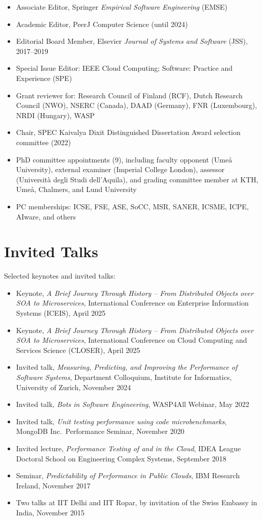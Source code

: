 \documentclass[a4paper,11pt]{article}
\begin{document}
\begin{itemize}
  \item Associate Editor, Springer \emph{Empirical Software Engineering} (EMSE)
  \item Academic Editor, PeerJ Computer Science (until 2024)
  \item Editorial Board Member, Elsevier \emph{Journal of Systems and Software} (JSS), 2017--2019
  \item Special Issue Editor: IEEE Cloud Computing; Software: Practice and Experience (SPE)
  \item Grant reviewer for: Research Council of Finland (RCF), Dutch Research Council (NWO), NSERC (Canada), DAAD (Germany), FNR (Luxembourg), NRDI (Hungary), WASP
  \item Chair, SPEC Kaivalya Dixit Distinguished Dissertation Award selection committee (2022)
  \item PhD committee appointments (9), including faculty opponent (Umeå University), external examiner (Imperial College London), assessor (Università degli Studi dell'Aquila), and grading committee member at KTH, Umeå, Chalmers, and Lund University
  \item PC memberships: ICSE, FSE, ASE, SoCC, MSR, SANER, ICSME, ICPE, AIware, and others
\end{itemize}

\section{Invited Talks}

Selected keynotes and invited talks:
\begin{itemize}
  \item Keynote, \emph{A Brief Journey Through History -- From Distributed Objects over SOA to Microservices}, International Conference on Enterprise Information Systems (ICEIS), April 2025
  \item Keynote, \emph{A Brief Journey Through History -- From Distributed Objects over SOA to Microservices}, International Conference on Cloud Computing and Services Science (CLOSER), April 2025
  \item Invited talk, \emph{Measuring, Predicting, and Improving the Performance of Software Systems}, Department Colloquium, Institute for Informatics, University of Zurich, November 2024
  \item Invited talk, \emph{Bots in Software Engineering}, WASP4All Webinar, May 2022
  \item Invited talk, \emph{Unit testing performance using code microbenchmarks}, MongoDB Inc.\ Performance Seminar, November 2020
  \item Invited lecture, \emph{Performance Testing of and in the Cloud}, IDEA League Doctoral School on Engineering Complex Systems, September 2018
  \item Seminar, \emph{Predictability of Performance in Public Clouds}, IBM Research Ireland, November 2017
  \item Two talks at IIT Delhi and IIT Ropar, by invitation of the Swiss Embassy in India, November 2015
\end{itemize}
\end{document}
